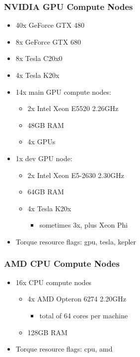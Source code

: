 \begin{frame}\frametitle{NVIDIA GPU Compute Nodes}

\begin{itemize}
\item
  40x GeForce GTX 480
\item
  8x GeForce GTX 680
\item
  8x Tesla C20x0
\item
  4x Tesla K20x
\item
  14x main GPU compute nodes:

  \begin{itemize}
  \itemsep1pt\parskip0pt
  \item
    2x Intel Xeon E5520 2.26GHz
  \item
    48GB RAM
  \item
    4x GPUs
  \end{itemize}
\item
  1x dev GPU node:

  \begin{itemize}
  \itemsep1pt\parskip0pt
  \item
    2x Intel Xeon E5-2630 2.30GHz
  \item
    64GB RAM
  \item
    4x Tesla K20x

    \begin{itemize}
    \itemsep1pt\parskip0pt
    \item
      sometimes 3x, plus Xeon Phi
    \end{itemize}
  \end{itemize}
\item
  Torque resource flags: gpu, tesla, kepler
\end{itemize}

\end{frame}

\begin{frame}\frametitle{AMD CPU Compute Nodes}

\begin{itemize}
\itemsep1pt\parskip0pt
\item
  16x CPU compute nodes

  \begin{itemize}
  \itemsep1pt\parskip0pt
  \item
    4x AMD Opteron 6274 2.20GHz

    \begin{itemize}
    \itemsep1pt\parskip0pt
    \item
      total of 64 cores per machine
    \end{itemize}
  \item
    128GB RAM
  \end{itemize}
\item
  Torque resource flags: cpu, amd
\end{itemize}

\end{frame}

